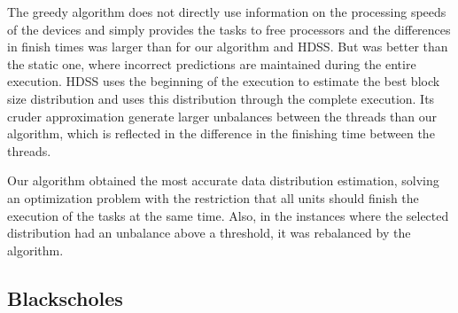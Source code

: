 \documentclass[journal]{IEEEtran}
\begin{document}
The greedy algorithm does not directly use information on the processing speeds
of the devices and simply provides the tasks to free processors and the
differences in finish times was larger than for our algorithm and HDSS. But was
better than the static one, where incorrect predictions are maintained during
the entire execution. HDSS uses the beginning of the execution to estimate the
best block size distribution and uses this distribution through the complete
execution. Its cruder approximation generate larger unbalances between the
threads than our algorithm, which is reflected in the difference in the
finishing time between the threads.

Our algorithm obtained the most accurate data distribution estimation, solving
an optimization problem with the restriction that all units should finish the
execution of the tasks at the same time. Also, in the instances where the
selected distribution had an unbalance above a threshold, it was rebalanced by
the algorithm.

\subsection{Blackscholes}
\end{document}
